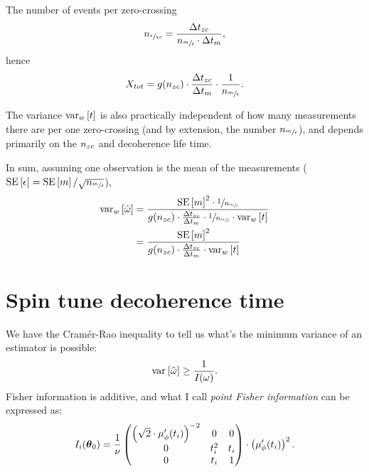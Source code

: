 \documentclass{article}
\begin{document}
The number of events per zero-crossing 
\[
	n_{\sfrac{\epsilon}{zc}} = \frac{\Delta t_{zc}}{n_{\sfrac{m}{\epsilon}}\cdot \Delta t_{m}},
\]
hence
\[
	X_{tot} = g(n_{zc}) \cdot \frac{\Delta t_{zc}}{\Delta t_{m}}\cdot \frac{1}{n_{\sfrac{m}{\epsilon}}}.
\]

The variance $\var[w]{t}$ is also practically independent of how many measurements there are per one zero-crossing (and by extension, the number $n_{\sfrac{m}{\epsilon}}$), and depends primarily on the $n_{zc}$ and decoherence life time.

In sum, assuming one observation is the mean of the measurements ($\SE{\obs} = \SE{\meas}/\sqrt{\Nmo}$), 
\begin{align*}
	\var[w]{\hat{\omega}} &= \frac{\SE{\meas}^2\cdot \sfrac{1}{\Nmo}}{g(\Nzc)\cdot \frac{\Delta t_{zc}}{\Delta t_{\meas}}\cdot \sfrac{1}{\Nmo} \cdot \var[w]{t}} \\
		&= \frac{\SE{\meas}^2}{g(\Nzc)\cdot \frac{\Delta t_{zc}}{\Delta t_{\meas}} \cdot \var[w]{t}}
\end{align*}


\section{Spin tune decoherence time}

We have the Cram\'er-Rao inequality to tell us what's the minimum variance of an estimator is possible:
\[
	\var{\hat{\omega}} \geq \frac{1}{\Fisher(\omega)}.
\]
Fisher information is additive, and what I call \emph{point Fisher information} can be expressed as:
\[
	\Fisher[i] = \frac{1}{\nu}\begin{pmatrix}
		\bkt{\sqrt{2}\cdot\mupp}^{-2} & 0     & 0   \\
		0                             & t_i^2 & t_i \\
		0                             & t_i   & 1
	\end{pmatrix}\cdot \bkt{\mupp}^2.
\]

\begin{wrapfigure}{l}{.25\textwidth}
\end{wrapfigure}
\end{document}
